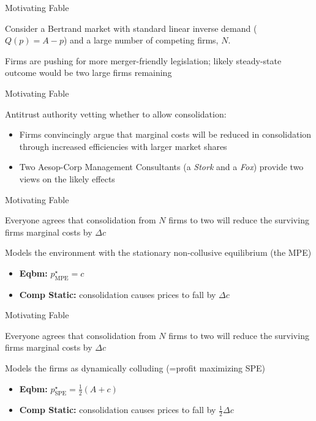 \documentclass[english]{beamer}
\begin{document}
\begin{frame}{Motivating Fable}
    \begin{card}
     Consider a Bertrand market with standard linear inverse demand ($Q(p)=A-p$) and a large number of competing firms, $N$.
    \end{card} 
 
    \begin{card}
     Firms are pushing for more merger-friendly legislation; likely steady-state outcome would be two large firms remaining
    \end{card}
\end{frame}
\begin{frame}{Motivating Fable}
\begin{card}
Antitrust authority vetting whether to allow consolidation:
        \begin{itemize}
            \item Firms convincingly argue that marginal costs will be reduced in consolidation through increased efficiencies with larger market shares
            \item Two Aesop-Corp Management Consultants (a \emph{Stork} and a \emph{Fox}) provide two views on the likely effects
        \end{itemize}
\end{card}
\end{frame}


\begin{frame}{Motivating Fable}
\begin{card}
 Everyone agrees  that consolidation from $N$ firms to two will reduce the surviving firms marginal costs by $\Delta c$
\end{card}
\begin{card}[Stork]
 Models the environment with the stationary non-collusive equilibrium (the MPE)
        \begin{itemize}
            \item \textbf{Eqbm:} $p^{\star}_{\text{MPE}}=c$ 
            \item \textbf{Comp Static:} consolidation causes prices to fall by $\Delta c$
        \end{itemize}
\end{card}

\end{frame}

\begin{frame}{Motivating Fable}
\begin{card}
 Everyone agrees  that consolidation from $N$ firms to two will reduce the surviving firms marginal costs by $\Delta c$
\end{card}
\begin{card}[Fox]
Models the firms as dynamically colluding (=profit maximizing SPE)
    \begin{itemize}
            \item \textbf{Eqbm:} $p^{\star}_{\text{SPE}}=\tfrac{1}{2}\left(A+c\right)$
            \item \textbf{Comp Static:} consolidation causes prices to fall by $\tfrac{1}{2}\Delta c$
        \end{itemize}
\end{card}
\end{frame}
\end{document}
